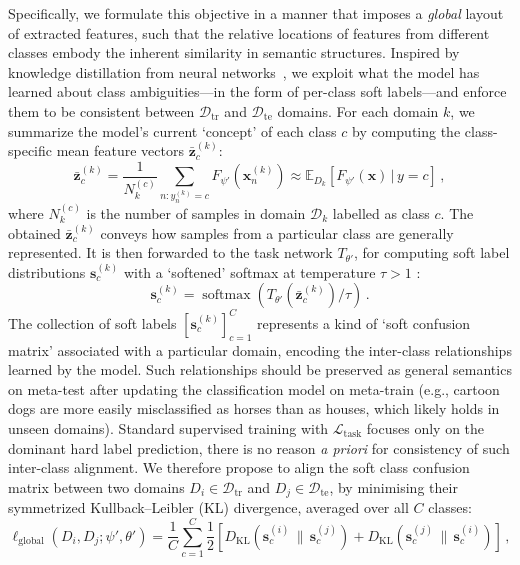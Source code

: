 \documentclass{article}
\newcommand{\Domains}{\mathcal{D}}
\newcommand{\TrainDomains}{\Domains_\mathrm{tr}}
\newcommand{\TestDomains}{\Domains_\mathrm{te}}
\newcommand{\TaskLoss}{\mathcal{L}_\mathrm{task}}
\newcommand{\LabelLossPair}{\ell_\mathrm{global}}
\newcommand{\KLDiv}{D_\mathrm{KL}}
\newcommand{\given}{\,|\,}
\newcommand{\expec}{\mathbb{E}}
\newcommand{\softmax}{\operatorname{softmax}}
\def\*#1{\mathbf{#1}}
\def\SoftLabels_#1#2{\*s^{(#1)}_{#2}}
\begin{document}
Specifically, we formulate this objective in a manner that imposes a \emph{global} layout of extracted features, such that the relative locations of features from different classes embody the inherent similarity in semantic structures. Inspired by knowledge distillation from neural networks~\citep{hinton2014distilling}, we exploit what the model has learned about class ambiguities---in the form of per-class soft labels---and enforce them to be consistent between $\TrainDomains$ and $\TestDomains$ domains.
For each domain $k$, we summarize the model's current `concept' of each class $c$ by computing the class-specific mean feature vectors $\bar{\*z}^{(k)}_c$:
\begin{equation}
    \bar{\*z}^{(k)}_c = \frac{1}{N_k^{(c)}} \sum_{n: y^{(k)}_n=c} F_{\psi'}(\*x^{(k)}_n)
        \approx \expec_{D_k}[F_{\psi'}(\*x) \given y=c] \,,
\end{equation}
where $N_k^{(c)}$ is the number of samples in domain $\mathcal{D}_k$ labelled as class $c$. 
The obtained $\bar{\*z}^{(k)}_c$ conveys how samples from a particular class are generally represented. It is then forwarded to the task network $T_{\theta'}$, for computing soft label distributions $\SoftLabels_kc$ with a `softened' softmax at temperature $\tau>1$ \citep{hinton2014distilling}:
\begin{equation}\label{eq:soft_labels}
    \SoftLabels_kc = \softmax(T_{\theta'}(\bar{\*z}^{(k)}_c) / \tau) \,.
\end{equation}
The collection of soft labels $[\SoftLabels_kc]_{c=1}^C$ represents a kind of `soft confusion matrix' associated with a particular domain, encoding the inter-class relationships learned by the model.
Such relationships should be preserved as general semantics on meta-test after updating the classification model on meta-train (e.g., cartoon dogs are more easily misclassified as horses than as houses, which likely holds in unseen domains).
Standard supervised training with $\TaskLoss$ focuses only on the dominant hard label prediction, there is no reason \textit{a priori} for consistency of such inter-class alignment.
We therefore propose to align the soft class confusion matrix between two domains $D_i \in \TrainDomains$ and $D_j \in \TestDomains$, by minimising their symmetrized Kullback--Leibler (KL) divergence, averaged over all $C$ classes:
\begin{equation}\label{eq:label_loss}
    \LabelLossPair(D_i, D_j; \psi', \theta') = \frac{1}{C} \sum_{c=1}^C \frac{1}{2} [\KLDiv(\SoftLabels_ic \,\|\, \SoftLabels_jc) + \KLDiv(\SoftLabels_jc \,\|\, \SoftLabels_ic)] \,,
\end{equation}
\end{document}
